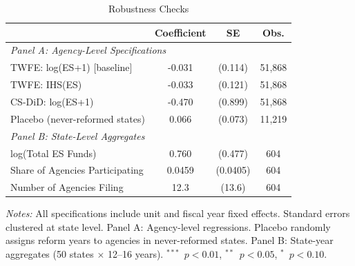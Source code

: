 \begin{table}[!htbp]
\centering
\begin{threeparttable}
\caption{Robustness Checks}
\label{tab:robust}
\begin{tabular}{@{}lccc@{}}
\toprule
 & Coefficient & SE & Obs. \\
\midrule
\multicolumn{4}{l}{\textit{Panel A: Agency-Level Specifications}} \\
\quad TWFE: log(ES+1) [baseline] & -0.031 & (0.114) & 51,868 \\
\quad TWFE: IHS(ES) & -0.033 & (0.121) & 51,868 \\
\quad CS-DiD: log(ES+1) & -0.470 & (0.899) & 51,868 \\
\quad Placebo (never-reformed states) & 0.066 & (0.073) & 11,219 \\
\midrule
\multicolumn{4}{l}{\textit{Panel B: State-Level Aggregates}} \\
\quad log(Total ES Funds) & 0.760 & (0.477) & 604 \\
\quad Share of Agencies Participating & 0.0459 & (0.0405) & 604 \\
\quad Number of Agencies Filing & 12.3 & (13.6) & 604 \\
\bottomrule
\end{tabular}
\begin{tablenotes}[flushleft]\small
\item \textit{Notes:} All specifications include unit and fiscal year fixed effects. Standard errors clustered at state level. Panel A: Agency-level regressions. Placebo randomly assigns reform years to agencies in never-reformed states. Panel B: State-year aggregates (50 states $\times$ 12--16 years). $^{***}$~$p<0.01$, $^{**}$~$p<0.05$, $^{*}$~$p<0.10$.
\end{tablenotes}
\end{threeparttable}
\end{table}

